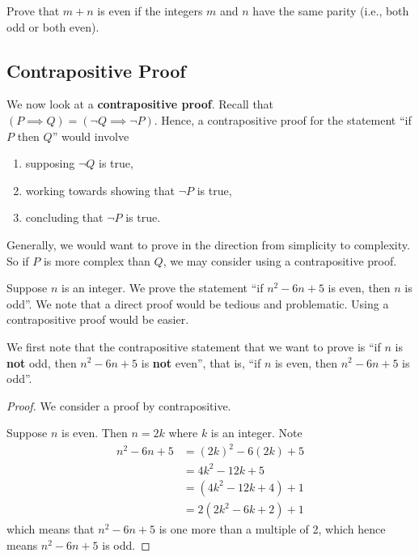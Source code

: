\begin{exercise}
    Prove that $m + n$ is even if the integers $m$ and $n$ have the same parity (i.e., both odd or both even). 
\end{exercise}

\subsection{Contrapositive Proof}
We now look at a \textbf{contrapositive proof}. Recall that $(P \implies Q) = (\lnot Q \implies \lnot P)$. Hence, a contrapositive proof for the statement ``if $P$ then $Q$'' would involve
\begin{enumerate}
    \item supposing $\lnot Q$ is true,
    \item working towards showing that $\lnot P$ is true,
    \item concluding that $\lnot P$ is true.
\end{enumerate}

Generally, we would want to prove in the direction from simplicity to complexity. So if $P$ is more complex than $Q$, we may consider using a contrapositive proof.

\begin{example}\label{example-if-(n-1)(n-5)-is-even-then-n-is-odd}
    Suppose $n$ is an integer. We prove the statement ``if $n^2 - 6n + 5$ is even, then $n$ is odd''. We note that a direct proof would be tedious and problematic. Using a contrapositive proof would be easier.
    
    We first note that the contrapositive statement that we want to prove is ``if $n$ is \textbf{not} odd, then $n^2 - 6n + 5$ is \textbf{not} even'', that is, ``if $n$ is even, then $n^2 - 6n + 5$ is odd''.
    \begin{proof}
        We consider a proof by contrapositive.
        
        Suppose $n$ is even. Then $n = 2k$ where $k$ is an integer. Note
        \begin{align*}
            n^2 - 6n + 5 &= (2k)^2 - 6(2k) + 5\\
            &= 4k^2 - 12k + 5\\
            &= (4k^2 - 12k + 4) + 1\\
            &= 2(2k^2 - 6k + 2) + 1
        \end{align*}
        which means that $n^2 - 6n + 5$ is one more than a multiple of 2, which hence means $n^2 - 6n + 5$ is odd.
    \end{proof}    
\end{example}

